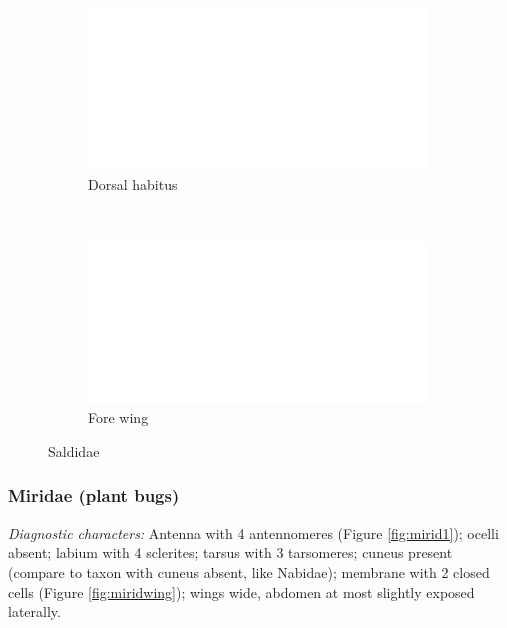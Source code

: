 \documentclass[letterpaper, 11pt]{article}
\begin{document}
\begin{figure}[ht!]
 \centering
 \begin{subfigure}[ht!]{0.27\textwidth}
  \includegraphics[width=\textwidth]{image14}
  \caption{Dorsal habitus}
  \label{fig:saldid1}
 \end{subfigure}
 ~ %
 \begin{subfigure}[ht!]{0.55\textwidth}
  \includegraphics[width=\textwidth]{image14}
  \caption{Fore wing}
  \label{fig:saldidwing}
 \end{subfigure}
 \caption{Saldidae}\label{fig:saldid}
\end{figure}

\subsubsection{Miridae (plant bugs)}
\noindent{}\textit{Diagnostic characters:} Antenna with 4 antennomeres (Figure \ref{fig:mirid1}); ocelli absent; labium with 4 sclerites; tarsus with 3 tarsomeres; cuneus present (compare to taxon with cuneus absent, like Nabidae); membrane with 2 closed cells (Figure \ref{fig:miridwing}); wings wide, abdomen at most slightly exposed laterally.\\
\end{document}
